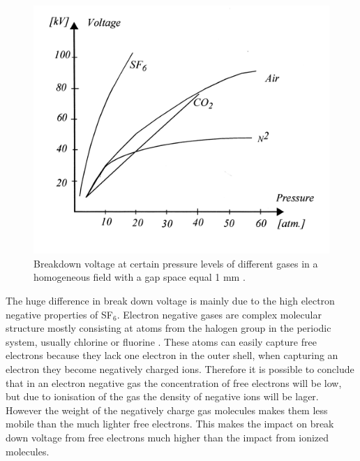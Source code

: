 \documentclass[10pt,a4paper]{article} %
\begin{document}
\begin{figure}[H]
\centering
\includegraphics[scale=1]{Bilder/Discussion/Breakdown_voltage.png}
\caption{Breakdown voltage at certain pressure levels of different gases in a homogeneous field with a gap space equal 1 mm  \cite{bib:TET4160HVIM}.} \label{fig:breakDownVoltage}
\end{figure}

The huge difference in break down voltage is mainly due to the high electron negative properties of SF$_6$. Electron negative gases are complex molecular structure mostly consisting at atoms from the halogen group in the periodic system, usually chlorine or fluorine \cite{bib:TET4160HVIM}. These atoms can easily capture free electrons because they lack one electron in the outer shell, when capturing an electron they become negatively charged ions. Therefore it is possible to conclude that in an electron negative gas the concentration of free electrons will be low, but due to ionisation of the gas the density of negative ions will be lager. However the weight of the negatively charge gas molecules makes them less mobile than the much lighter free electrons. This makes the impact on break down voltage from free electrons much higher than the impact from ionized molecules.
\end{document}
